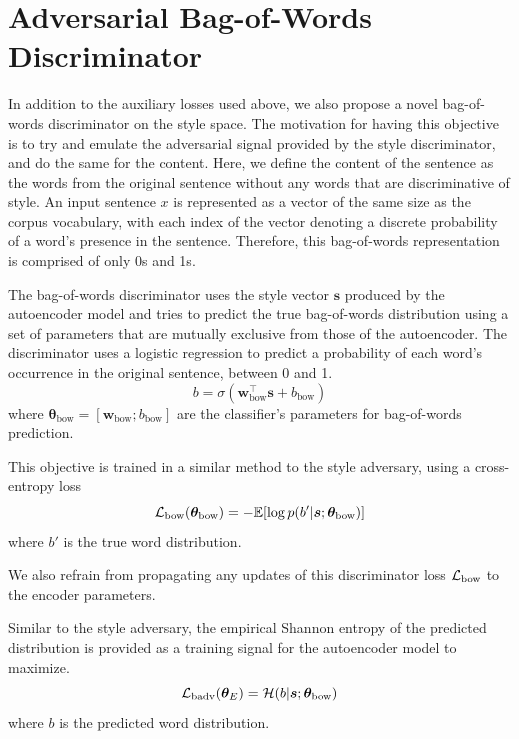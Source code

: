 \section{Adversarial Bag-of-Words Discriminator} \label{sec:adversarial-bow-objective}

In addition to the auxiliary losses used above, we also propose a novel bag-of-words discriminator on the style space. The motivation for having this objective is to try and emulate the adversarial signal provided by the style discriminator, and do the same for the content. Here, we define the content of the sentence as the words from the original sentence without any words that are discriminative of style. An input sentence $x$ is represented as a vector of the same size as the corpus vocabulary, with each index of the vector denoting a discrete probability of a word's presence in the sentence. Therefore, this bag-of-words representation is comprised of only 0s and 1s.

The bag-of-words discriminator uses the style vector $\bm s$ produced by the autoencoder model and tries to predict the true bag-of-words distribution using a set of parameters that are mutually exclusive from those of the autoencoder. The discriminator uses a logistic regression to predict a probability of each word's occurrence in the original sentence, between 0 and 1.
\begin{equation}
	b = \sigma(\bm w_\text{bow}^\top \bm s + b_\text{bow})
\end{equation}
where $\bm\theta_\text{bow}=[\bm w_\text{bow}; b_\text{bow}]$ are the classifier's parameters for bag-of-words prediction.

This objective is trained in a similar method to the style adversary, using a cross-entropy loss
\begin{equation} \label{eqn:adv-bow-disc-loss}
	\mathcal{L}_\text{bow}(\bm\theta_\text{bow}) =
	- \mathbb{E} [\log p(b' | \bm s; \bm\theta_\text{bow})]
\end{equation}
where $b'$ is the true word distribution.

We also refrain from propagating any updates of this discriminator loss $\mathcal{L}_\text{bow}$ to the encoder parameters.

Similar to the style adversary, the empirical Shannon entropy of the predicted distribution is provided as a training signal for the autoencoder model to maximize.
\begin{equation}
	\mathcal{L}_\text{badv}(\bm\theta_E) = \mathcal{H}(b | \bm s; \bm\theta_\text{bow})
\end{equation}
where $b$ is the predicted word distribution.

